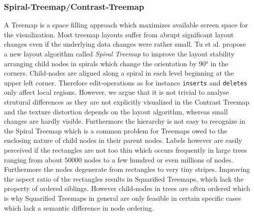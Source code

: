 \subsubsection{Spiral-Treemap/Contrast-Treemap\cite{tu2007visualizing}}
A Treemap is a space filling approach which maximizes available screen space for the visualization. Most treemap layouts suffer from abrupt significant layout changes even if the underlying data changes were rather small. Tu et al. propose a new layout algorithm called \emph{Spiral Treemap} to improve the layout stability arranging child nodes in spirals which change the orientation by 90° in the corners. Child-nodes are aligned along a spiral in each level beginning at the upper left corner. Therefore edit-operations as for instance \texttt{inserts} and \texttt{deletes} only affect local regions. However, we argue that it is not trivial to analyse strutural differences as they are not explicitly visualized in the Contrast Treemap and the texture distortion depends on the layout algorithm, whereas small changes are hardly visible. Furthermore the hierarchy is not easy to recognize in the Spiral Treemap which is a common problem for Treemaps owed to the enclosing nature of child nodes in their parent nodes. Labels however are easily perceived if the rectangles are not too thin which occurs frequently in large trees ranging from about $50000$ nodes to a few hundred or even millions of nodes. Furthermore the nodes degenerate from rectangles to very tiny stripes. Improving the aspect ratio of the rectangles results in Squarified Treemaps\cite{bruls2000squarified}, which lack the property of ordered siblings. However child-nodes in trees are often ordered which is why Squarified Treemaps in general are only feasible in certain specific cases which lack a semantic difference in node ordering. %

